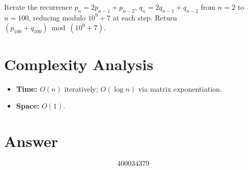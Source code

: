 \documentclass[11pt]{article}
\theoremstyle{definition}
\begin{document}
Iterate the recurrence $p_n = 2p_{n-1}+p_{n-2}$, $q_n = 2q_{n-1}+q_{n-2}$ from $n=2$ to $n=100$, reducing modulo $10^9+7$ at each step. Return $(p_{100}+q_{100}) \bmod (10^9+7)$.

\section{Complexity Analysis}

\begin{itemize}
    \item \textbf{Time:} $O(n)$ iteratively; $O(\log n)$ via matrix exponentiation.
    \item \textbf{Space:} $O(1)$.
\end{itemize}

\section{Answer}

\[
\boxed{400034379}
\]
\end{document}
